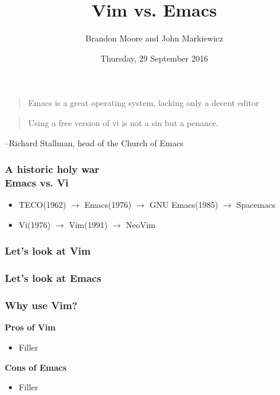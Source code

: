 \documentclass[8pt]{beamer}
\title{Vim vs. Emacs}
\author{Brandon Moore and John Markiewicz}
\date{Thursday, 29 September 2016}
\begin{document}
\begin{frame}
	\titlepage
\end{frame}

\begin{frame}
  \begin{quote}
    Emacs is a great operating system, lacking only a decent editor
  \end{quote}
\end{frame}

\begin{frame}
  \begin{quote}
    Using a free version of vi is not a sin but a penance.
  \end{quote}
  \begin{flushright}
    --Richard Stallman, head of the Church of Emacs
  \end{flushright}
\end{frame}

\begin{frame}
  \frametitle{A historic holy war\\Emacs vs. Vi}
  \begin{itemize}
  \item TECO(1962) $\rightarrow$ Emacs(1976) $\rightarrow$ GNU Emacs(1985) $\rightarrow$ Spacemacs
  \item Vi(1976) $\rightarrow$ Vim(1991) $\rightarrow$ NeoVim
  \end{itemize}
\end{frame}

\begin{frame}
  \frametitle{Let's look at Vim}
\end{frame}

\begin{frame}
  \frametitle{Let's look at Emacs}
\end{frame}

\begin{frame}
  \frametitle{Why use Vim?}
  \begin{multicols}{2}
    \textbf{Pros of Vim}
    \begin{itemize}
    \item Filler
    \end{itemize}
    \columnbreak
    \textbf{Cons of Emacs}
    \begin{itemize}
    \item Filler
    \end{itemize}
  \end{multicols}
\end{frame}
\end{document}
